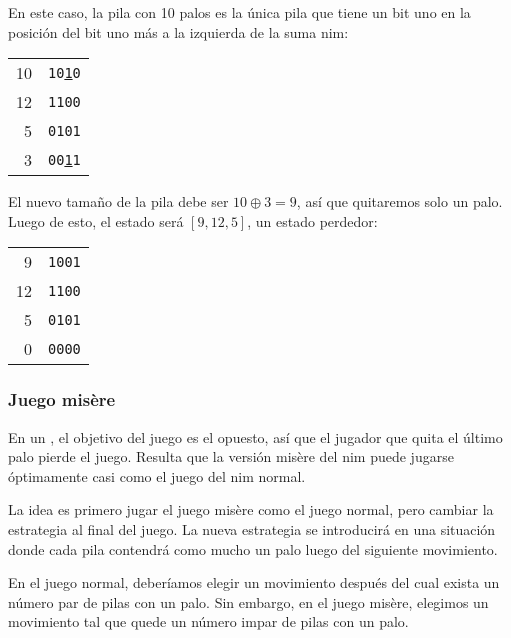 En este caso, la pila con 10 palos es la única pila que tiene un bit uno
en la posición del bit uno más a la izquierda de la suma nim:

\begin{center}
    \begin{tabular}{r|r}
        10 & \texttt{10\underline{1}0} \\
        12 & \texttt{1100}             \\
        5  & \texttt{0101}             \\
        \hline
        3  & \texttt{00\underline{1}1} \\
    \end{tabular}
\end{center}

El nuevo tamaño de la pila debe ser $10 \oplus 3 = 9$, así que quitaremos
solo un palo. Luego de esto, el estado será $[9,12,5]$, un estado perdedor:

\begin{center}
    \begin{tabular}{r|r}
        9  & \texttt{1001} \\
        12 & \texttt{1100} \\
        5  & \texttt{0101} \\
        \hline
        0  & \texttt{0000} \\
    \end{tabular}
\end{center}

\subsubsection{Juego misère}


En un , el objetivo del juego es el opuesto, así que
el jugador que quita el último palo pierde el juego. Resulta que la versión
misère del nim puede jugarse óptimamente casi como el juego del nim normal.

La idea es primero jugar el juego misère como el juego normal, pero cambiar
la estrategia al final del juego. La nueva estrategia se introducirá
en una situación donde cada pila contendrá como mucho un palo luego del
siguiente movimiento.

En el juego normal, deberíamos elegir un movimiento después del cual
exista un número par de pilas con un palo. Sin embargo, en el juego
misère, elegimos un movimiento tal que quede un número impar de pilas
con un palo.

